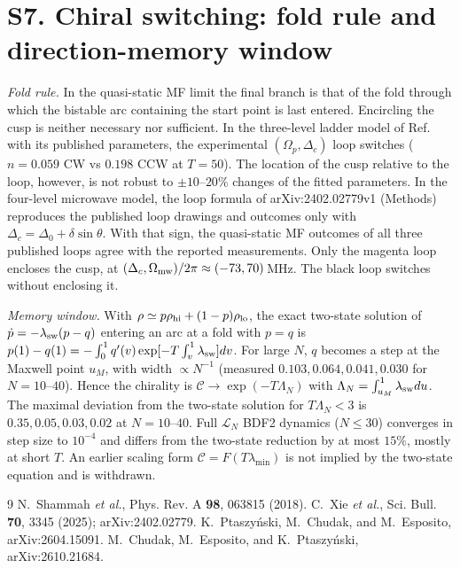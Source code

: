 \documentclass[aps,prl,onecolumn,superscriptaddress,amsmath,amssymb]{revtex4-2}
\newcommand{\Lc}{\mathcal{L}}
\begin{document}
\section{S7. Chiral switching: fold rule and direction-memory window}
\emph{Fold rule.} In the quasi-static MF limit the final branch is that of the fold through which the bistable arc containing the start point is last entered. Encircling the cusp is neither necessary nor sufficient. In the three-level ladder model of Ref.~\cite{Xie2025} with its published parameters, the experimental $(\Omega_p,\Delta_c)$ loop switches ($n=0.059$ CW vs $0.198$ CCW at $T=50$). The location of the cusp relative to the loop, however, is not robust to $\pm10$--$20\%$ changes of the fitted parameters. In the four-level microwave model, the loop formula of arXiv:2402.02779v1 (Methods) reproduces the published loop drawings and outcomes only with $\Delta_c=\Delta_0+\delta\sin\theta$. With that sign, the quasi-static MF outcomes of all three published loops agree with the reported measurements. Only the magenta loop encloses the cusp, at $(\Delta_c,\Omega_{\rm mw})/2\pi\approx(-73,70)$\,MHz. The black loop switches without enclosing it.

\emph{Memory window.} With $\rho\simeq p\rho_{\rm hi}+(1-p)\rho_{\rm lo}$, the exact two-state solution of $\dot p=-\lambda_{\rm sw}(p-q)$ entering an arc at a fold with $p=q$ is $p(1)-q(1)=-\int_0^1 q'(v)\exp[-T\int_v^1\lambda_{\rm sw}]dv$. For large $N$, $q$ becomes a step at the Maxwell point $u_M$, with width $\propto N^{-1}$ (measured $0.103,0.064,0.041,0.030$ for $N=10$--$40$). Hence the chirality is $\mathcal C\to\exp(-T\Lambda_N)$ with $\Lambda_N=\int_{u_M}^{1}\lambda_{\rm sw}du$. The maximal deviation from the two-state solution for $T\Lambda_N<3$ is $0.35,0.05,0.03,0.02$ at $N=10$--$40$. Full $\Lc_N$ BDF2 dynamics ($N\le30$) converges in step size to $10^{-4}$ and differs from the two-state reduction by at most $15\%$, mostly at short $T$. An earlier scaling form $\mathcal C=F(T\lambda_{\min})$ is not implied by the two-state equation and is withdrawn.

\begin{thebibliography}{9}
 N.~Shammah \textit{et al.}, Phys. Rev. A \textbf{98}, 063815 (2018).
 C.~Xie \textit{et al.}, Sci. Bull. \textbf{70}, 3345 (2025); arXiv:2402.02779.
 K.~Ptaszy\'nski, M.~Chudak, and M.~Esposito, arXiv:2604.15091.
 M.~Chudak, M.~Esposito, and K.~Ptaszy\'nski, arXiv:2610.21684.
\end{thebibliography}
\end{document}
